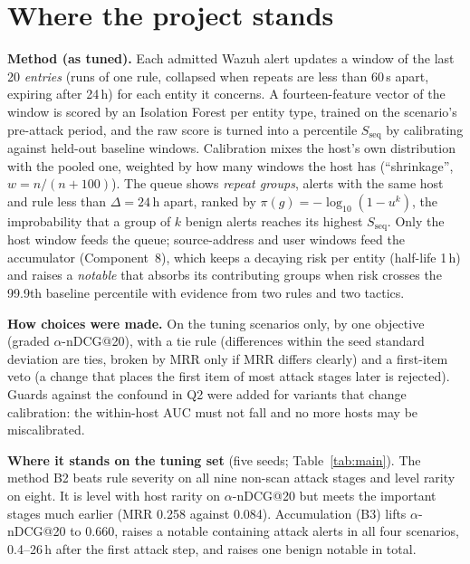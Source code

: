 \documentclass[10.5pt,a4paper]{article}
\newcommand{\sub}[1]{\par\smallskip\noindent\textbf{#1}\quad}
\begin{document}
\section{Where the project stands}
\label{sec:status}

\sub{Method (as tuned).} Each admitted Wazuh alert updates a window of the last 20 \emph{entries} (runs of one rule, collapsed when repeats are less than 60\,s apart, expiring after 24\,h) for each entity it concerns. A fourteen-feature vector of the window is scored by an Isolation Forest per entity type, trained on the scenario's pre-attack period, and the raw score is turned into a percentile $S_\mathrm{seq}$ by calibrating against held-out baseline windows. Calibration mixes the host's own distribution with the pooled one, weighted by how many windows the host has (``shrinkage'', $w = n/(n+100)$). The queue shows \emph{repeat groups}, alerts with the same host and rule less than $\Delta = 24$\,h apart, ranked by $\pi(g) = -\log_{10}(1-u^{k})$, the improbability that a group of $k$ benign alerts reaches its highest $S_\mathrm{seq}$. Only the host window feeds the queue; source-address and user windows feed the accumulator (Component~8), which keeps a decaying risk per entity (half-life 1\,h) and raises a \emph{notable} that absorbs its contributing groups when risk crosses the 99.9th baseline percentile with evidence from two rules and two tactics.

\sub{How choices were made.} On the tuning scenarios only, by one objective (graded $\alpha$-nDCG@20), with a tie rule (differences within the seed standard deviation are ties, broken by MRR only if MRR differs clearly) and a first-item veto (a change that places the first item of most attack stages later is rejected). Guards against the confound in Q2 were added for variants that change calibration: the within-host AUC must not fall and no more hosts may be miscalibrated.

\sub{Where it stands on the tuning set} (five seeds; Table~\ref{tab:main}). The method B2 beats rule severity on all nine non-scan attack stages and level rarity on eight. It is level with host rarity on $\alpha$-nDCG@20 but meets the important stages much earlier (MRR 0.258 against 0.084). Accumulation (B3) lifts $\alpha$-nDCG@20 to 0.660, raises a notable containing attack alerts in all four scenarios, 0.4--26\,h after the first attack step, and raises one benign notable in total.
\end{document}
